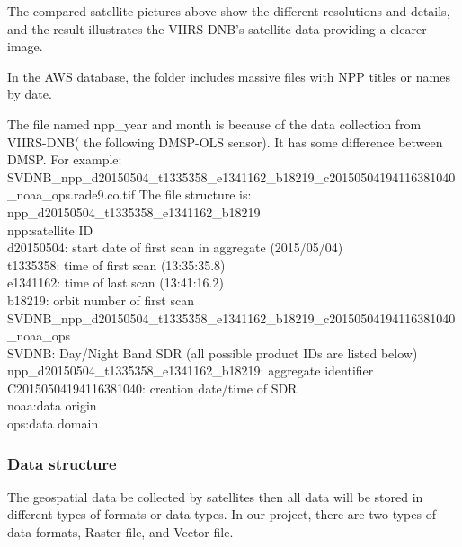 \documentclass[conference]{IEEEtran}
\begin{document}
The compared satellite pictures above show the different resolutions and details, and the result illustrates the VIIRS DNB's satellite data providing a clearer image.

In the AWS database, the folder includes massive files with NPP titles or names by date. 

\begin{figure}[t]
	 \quad
	\centering
	\quad
	\centering

\end{figure}

The file named npp_year and month is because of the data collection from VIIRS-DNB( the following DMSP-OLS sensor). It has some difference between DMSP.
For example:
SVDNB_npp_d20150504_t1335358_e1341162_b18219_c20150504194116381040_noaa_ops.rade9.co.tif
The file structure is:\\
npp_d20150504_t1335358_e1341162_b18219\\
npp:satellite ID\\
d20150504: start date of first scan in aggregate (2015/05/04)\\
t1335358: time of first scan (13:35:35.8)\\
e1341162: time of last scan (13:41:16.2)\\
b18219: orbit number of first scan\\

SVDNB_npp_d20150504_t1335358_e1341162_b18219_c20150504194116381040_noaa_ops\\
SVDNB: Day/Night Band SDR (all possible product IDs are listed below)\\
npp_d20150504_t1335358_e1341162_b18219: aggregate identifier\\
C20150504194116381040: creation date/time of SDR\\
noaa:data origin\\
ops:data domain

\subsubsection{Data structure}
The geospatial data be collected by satellites then all data will be stored in different types of formats or data types. In our project, there are two types of data formats, Raster file, and Vector file.
\end{document}
